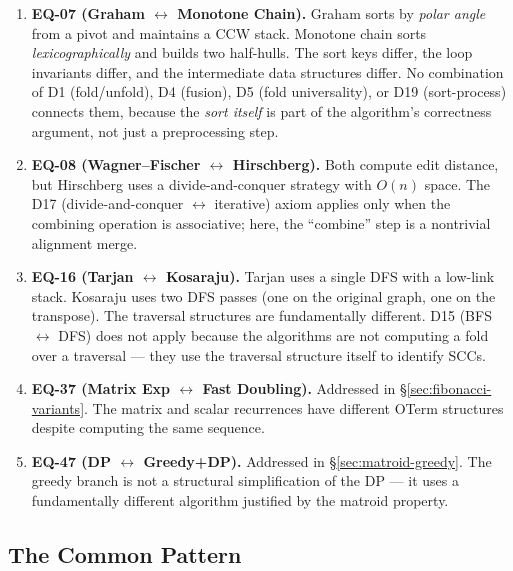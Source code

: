 \documentclass[11pt,a4paper]{report}
\theoremstyle{definition}
\theoremstyle{plain}
\begin{document}
\begin{enumerate}
  \item \textbf{EQ-07 (Graham $\leftrightarrow$ Monotone Chain).}
    Graham sorts by \emph{polar angle} from a pivot and maintains a
    CCW stack.  Monotone chain sorts \emph{lexicographically} and
    builds two half-hulls.  The sort keys differ, the loop invariants
    differ, and the intermediate data structures differ.  No
    combination of D1 (fold/unfold), D4 (fusion), D5 (fold
    universality), or D19 (sort-process) connects them, because the
    \emph{sort itself} is part of the algorithm's correctness argument,
    not just a preprocessing step.

  \item \textbf{EQ-08 (Wagner--Fischer $\leftrightarrow$ Hirschberg).}
    Both compute edit distance, but Hirschberg uses a
    divide-and-conquer strategy with $O(n)$ space.  The D17
    (divide-and-conquer $\leftrightarrow$ iterative) axiom applies
    only when the combining operation is associative; here, the
    ``combine'' step is a nontrivial alignment merge.

  \item \textbf{EQ-16 (Tarjan $\leftrightarrow$ Kosaraju).}
    Tarjan uses a single DFS with a low-link stack.
    Kosaraju uses two DFS passes (one on the original graph, one on
    the transpose).  The traversal structures are fundamentally
    different.  D15 (BFS $\leftrightarrow$ DFS) does not apply
    because the algorithms are not computing a fold over a traversal
    --- they use the traversal structure itself to identify SCCs.

  \item \textbf{EQ-37 (Matrix Exp $\leftrightarrow$ Fast Doubling).}
    Addressed in \S\ref{sec:fibonacci-variants}.  The matrix and
    scalar recurrences have different OTerm structures despite
    computing the same sequence.

  \item \textbf{EQ-47 (DP $\leftrightarrow$ Greedy+DP).}
    Addressed in \S\ref{sec:matroid-greedy}.  The greedy branch is
    not a structural simplification of the DP --- it uses a
    fundamentally different algorithm justified by the matroid
    property.
\end{enumerate}

\subsection{The Common Pattern}
\end{document}
